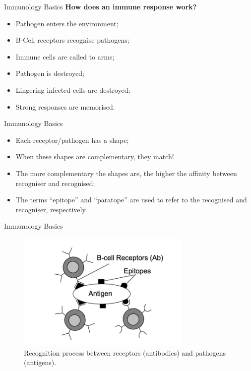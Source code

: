 \documentclass[xcolor=svgnames]{beamer}
\begin{document}
        \begin{frame}{Immunology Basics}
            \textbf{How does an immune response work?}
            
            \begin{itemize}
                \item Pathogen enters the environment;
                \item B-Cell receptors recognise pathogens;
                \item Immune cells are called to arms;
                \item Pathogen is destroyed;
                \item Lingering infected cells are destroyed;
                \item Strong responses are memorised.
            \end{itemize}
        \end{frame}
        
        \begin{frame}{Immunology Basics}
            \vspace{1em}
            \pause
            \begin{itemize}
                \item Each receptor/pathogen has a shape;
                \item When these shapes are complementary, they match!
                \item The more complementary the shapes are, the higher the affinity between recogniser and recognised;
                \item The terms ``epitope'' and ``paratope'' are used to refer to the recognised and recogniser, respectively.
            \end{itemize}
        \end{frame}
        
        \begin{frame}{Immunology Basics}
            \begin{figure}
                \centering
                \includegraphics[width=0.75\textwidth]{fig/recognition}
                \caption{Recognition process between receptors (antibodies) and pathogens (antigens).}
            \end{figure}
        \end{frame}
        
\end{document}
